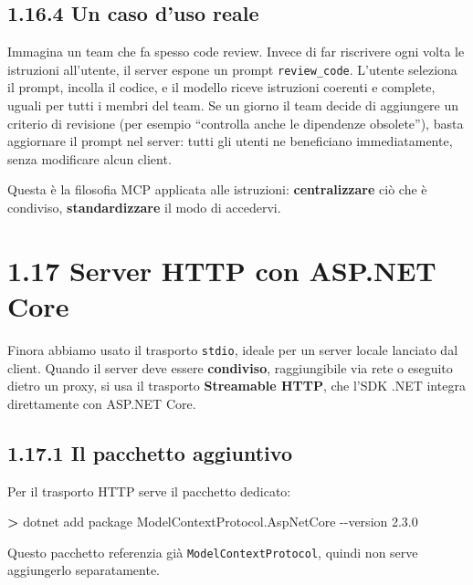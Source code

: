 \documentclass[
  italian,
  10pt,
]{book}
\newenvironment{Shaded}{\begin{snugshade}}{\end{snugshade}}
\newcommand{\AttributeTok}[1]{\textcolor[rgb]{0.13,0.29,0.53}{#1}}
\newcommand{\ExtensionTok}[1]{#1}
\newcommand{\NormalTok}[1]{#1}
\newcommand{\OperatorTok}[1]{\textcolor[rgb]{0.81,0.36,0.00}{\textbf{#1}}}
\begin{document}
\subsection{1.16.4 Un caso d'uso reale}\label{un-caso-duso-reale}

Immagina un team che fa spesso code review. Invece di far riscrivere
ogni volta le istruzioni all'utente, il server espone un prompt
\texttt{review\_code}. L'utente seleziona il prompt, incolla il codice,
e il modello riceve istruzioni coerenti e complete, uguali per tutti i
membri del team. Se un giorno il team decide di aggiungere un criterio
di revisione (per esempio ``controlla anche le dipendenze obsolete''),
basta aggiornare il prompt nel server: tutti gli utenti ne beneficiano
immediatamente, senza modificare alcun client.

Questa è la filosofia MCP applicata alle istruzioni:
\textbf{centralizzare} ciò che è condiviso, \textbf{standardizzare} il
modo di accedervi.

\section{1.17 Server HTTP con ASP.NET
Core}\label{server-http-con-asp.net-core}

Finora abbiamo usato il trasporto \texttt{stdio}, ideale per un server
locale lanciato dal client. Quando il server deve essere
\textbf{condiviso}, raggiungibile via rete o eseguito dietro un proxy,
si usa il trasporto \textbf{Streamable HTTP}, che l'SDK .NET integra
direttamente con ASP.NET Core.

\subsection{1.17.1 Il pacchetto
aggiuntivo}\label{il-pacchetto-aggiuntivo}

Per il trasporto HTTP serve il pacchetto dedicato:

\begin{Shaded}
\begin{Highlighting}[]
\OperatorTok{\textgreater{}}\NormalTok{ dotnet }\ExtensionTok{add}\NormalTok{ package ModelContextProtocol.AspNetCore }\AttributeTok{{-}{-}version}\NormalTok{ 2.3.0}
\end{Highlighting}
\end{Shaded}

Questo pacchetto referenzia già \texttt{ModelContextProtocol}, quindi
non serve aggiungerlo separatamente.
\end{document}
